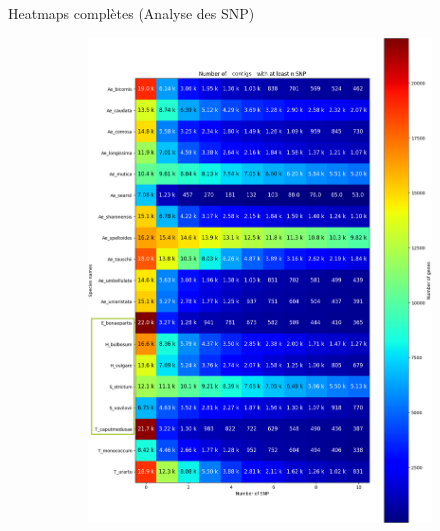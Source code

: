 \begin{frame}{Heatmaps complètes (Analyse des SNP)}
    \begin{figure}[p]
        \centering
        \begin{subfigure}[b]{0.4\paperwidth}
            \centering
            \includegraphics[width=\textwidth]{./Illustrations/Classic_Heatmap_SNP.png}
            \label{fig:ClassicSNPHeatmap}
        \end{subfigure}
        \hfill
        \begin{subfigure}[b]{0.4\paperwidth}
            \centering

\end{subfigure}
\end{figure}
\end{frame}
